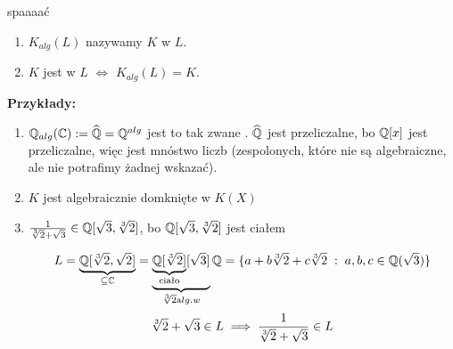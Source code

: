\begin{definition}{\color{pagColor}spaaaać}
    \begin{enumerate}
        \item $K_{alg}(L)$ nazywamy  $K$ w $L$.
        \item $K$ jest  w $L$ $\iff$ $K_{alg}(L)=K$.
    \end{enumerate}
\end{definition}

\textbf{Przykłady:} 
\begin{enumerate}
    \item $\mathbb{Q}_{alg}(\mathbb{C}):=\widehat{\mathbb{Q}}=\mathbb{Q}^{alg}$ jest to tak zwane . $\widehat{\mathbb{Q}}$ jest przeliczalne, bo $\mathbb{Q}[x]$ jest przeliczalne, więc jest mnóstwo liczb  (zespolonych, które nie są algebraiczne, ale nie potrafimy żadnej wskazać).
    \item $K$ jest algebraicznie domknięte w $K(X)$
    \item ${1\over\sqrt[3]{2}+\sqrt{3}}\in\mathbb{Q}[\sqrt{3},\sqrt[3]{2}]$, bo $\mathbb{Q}[\sqrt{3},\sqrt[3]{2}]$ jest ciałem
    
    $$L=\underbrace{\mathbb{Q}[\sqrt[3]{2},\sqrt{2}]}_{\subseteq \mathbb{C}}=\underbrace{\underbrace{\mathbb{Q}[\sqrt[3]{2}]}_{\text{ciało}}[\sqrt3]}_{\sqrt[3]{2}\text alg. w }\mathbb{Q}=\{a+b\sqrt[3]{2}+c\sqrt[3]{2}\;:\;a,b,c\in\mathbb{Q}(\sqrt{3})\}$$
    $$\sqrt[3]{2}+\sqrt3\in L\implies{1\over\sqrt[3]{2}+\sqrt{3}}\in L$$
\end{enumerate}
